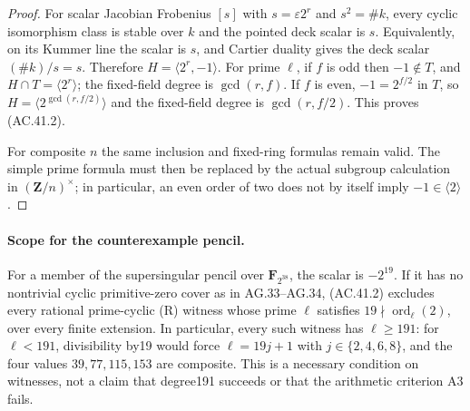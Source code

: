 \begin{proof}
For scalar Jacobian Frobenius $[s]$ with
$s=\varepsilon2^r$ and $s^2=\#k$, every cyclic
isomorphism class is stable over $k$ and the pointed
deck scalar is $s$. Equivalently, on its Kummer line
the scalar is $s$, and Cartier duality gives the
deck scalar $(\#k)/s=s$. Therefore
$H=\langle2^r,-1\rangle$. For prime $\ell$, if
$f$ is odd then $-1\notin T$, and
$H\cap T=\langle2^r\rangle$; the fixed-field degree
is $\gcd(r,f)$. If $f$ is even, $-1=2^{f/2}$ in
$T$, so $H=\langle2^{\gcd(r,f/2)}\rangle$ and
the fixed-field degree is $\gcd(r,f/2)$. This proves
(AC.41.2).

For composite $n$ the same inclusion and fixed-ring
formulas remain valid. The simple prime formula
must then be replaced by the actual subgroup
calculation in $(\mathbf Z/n)^\times$; in particular,
an even order of two does not by itself imply
$-1\in\langle2\rangle$.
\end{proof}

\paragraph{Scope for the counterexample pencil.}
For a member of the supersingular pencil over
$\mathbf F_{2^{38}}$, the scalar is $-2^{19}$.
If it has no nontrivial cyclic primitive-zero cover
as in AG.33--AG.34, (AC.41.2) excludes every rational
prime-cyclic \textup{(R)} witness whose prime $\ell$
satisfies $19\nmid\operatorname{ord}_\ell(2)$,
over every finite extension. In particular, every
such witness has $\ell\ge191$: for $\ell<191$,
divisibility by19 would force $\ell=19j+1$ with
$j\in\{2,4,6,8\}$, and the four values
$39,77,115,153$ are composite. This is a necessary
condition on witnesses, not a claim that degree191
succeeds or that the arithmetic criterion A3 fails.



